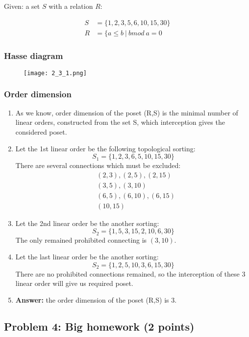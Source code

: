 Given: a set $S$ with a relation $R$:

\begin{align*}
S &= \{1,2,3,5,6,10,15,30\} \\
R &= \{ a \leq b\ |\ b mod\ a = 0
\end{align*}

\subsubsection{Hasse diagram}
\begin{figure}[h]
\centering
\texttt{[image: 2\_3\_1.png]}
\end{figure}

\subsubsection{Order dimension}

\begin{enumerate}
\item As we know, order dimension of the poset (R,S) is the minimal number of linear orders, constructed from the set S, which interception gives the considered poset.
\item Let the 1st linear order be the following topological sorting:
\[ S_1 = \{1,2,3,6,5,10,15,30\} \]
There are several connections which must be excluded:
\begin{align*}
&(2,3),(2,5),(2,15)\\
&(3,5),(3,10) \\
&(6,5),(6,10),(6,15)\\
&(10,15)
\end{align*}
\item Let the 2nd linear order be the another sorting:
\[S_2 = \{1,5,3,15,2,10,6,30\}\]
The only remained prohibited connecting is $(3,10)$.
\item Let the last linear order be the another sorting:
\[S_2 = \{1,2,5,10,3,6,15,30\}\]
There are no prohibited connections remained, so the interception of these 3 linear order will give us required poset.
\item \textbf{Answer:} the order dimension of the poset (R,S) is 3.
\end{enumerate}

\subsection{Problem 4: Big homework (2 points)}


